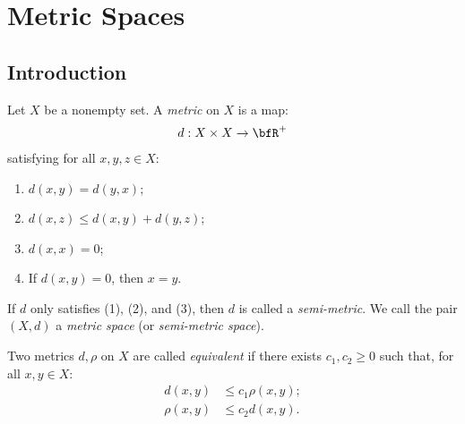 \chapter{Metric Spaces}

\section{Introduction}
    \begin{definition}
        Let $X$ be a nonempty set. A \textit{metric} on $X$ is a map:
            \begin{equation*}
            \begin{split}
                d:X \times X \rightarrow \bfR^+
            \end{split}
            \end{equation*}
        satisfying for all $x,y,z \in X$:
            \begin{enumerate}[label = (\arabic*)]
                \item $d(x,y) = d(y,x)$;
                \item $d(x,z) \leq d(x,y) + d(y,z)$;
                \item $d(x,x) = 0$;
                \item If $d(x,y) = 0$, then $x=y$.
            \end{enumerate}
        If $d$ only satisfies (1), (2), and (3), then $d$ is called a \textit{semi-metric}. We call the pair $(X,d)$ a \textit{metric space} (or \textit{semi-metric space}).
    \end{definition}

    \begin{definition}
        Two metrics $d,\rho$ on $X$ are called \textit{equivalent} if there exists $c_1,c_2 \geq 0$ such that, for all $x,y \in X$:
            \begin{equation*}
            \begin{split}
                d(x,y) &\leq c_1 \rho(x,y); \\
                \rho(x,y) &\leq c_2 d(x,y).
            \end{split}
            \end{equation*}
    \end{definition}